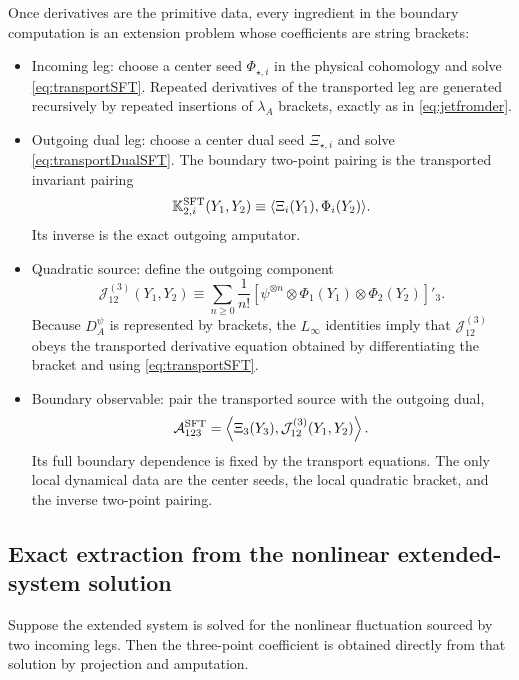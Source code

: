 \documentclass[11pt]{article}
\begin{document}
Once derivatives are the primitive data, every ingredient in the boundary computation is an extension problem whose coefficients are string brackets:
\begin{itemize}
\item Incoming leg: choose a center seed $\Phi_{\star,i}$ in the physical cohomology and solve \cref{eq:transportSFT}. Repeated derivatives of the transported leg are generated recursively by repeated insertions of $\lambda_A$ brackets, exactly as in \cref{eq:jetfromder}.
\item Outgoing dual leg: choose a center dual seed $\Xi_{\star,i}$ and solve \cref{eq:transportDualSFT}. The boundary two-point pairing is the transported invariant pairing
\begin{equation}
\mathbb{K}^{\rm SFT}_{2,i}(Y_1,Y_2)
\equiv
\langle \Xi_i(Y_1),\Phi_i(Y_2)\rangle.
\label{eq:K2SFT}
\end{equation}
Its inverse is the exact outgoing amputator.
\item Quadratic source: define the outgoing component
\begin{equation}
\mathcal{J}_{12}^{(3)}(Y_1,Y_2)
\equiv
\sum_{n\ge 0}\frac{1}{n!}
[\psi^{\otimes n}\otimes \Phi_1(Y_1)\otimes \Phi_2(Y_2)]'_3.
\label{eq:sourceSFT}
\end{equation}
Because $D_A^\psi$ is represented by brackets, the $L_\infty$ identities imply that $\mathcal{J}_{12}^{(3)}$ obeys the transported derivative equation obtained by differentiating the bracket and using \cref{eq:transportSFT}.
\item Boundary observable: pair the transported source with the outgoing dual,
\begin{equation}
\mathcal{A}_{123}^{\rm SFT}
=
\left\langle
\Xi_3(Y_3),\mathcal{J}_{12}^{(3)}(Y_1,Y_2)
\right\rangle.
\label{eq:ampSFT}
\end{equation}
Its full boundary dependence is fixed by the transport equations. The only local dynamical data are the center seeds, the local quadratic bracket, and the inverse two-point pairing.
\end{itemize}

\subsection{Exact extraction from the nonlinear extended-system solution}

Suppose the extended system is solved for the nonlinear fluctuation sourced by two incoming legs. Then the three-point coefficient is obtained directly from that solution by projection and amputation.
\end{document}
